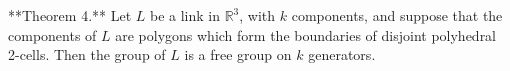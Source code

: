 **Theorem 4.** Let $L$ be a link in $\mathbb{R}^3$, with $k$ components, and suppose that the components of $L$ are polygons which form the boundaries of disjoint polyhedral 2-cells. Then the group of $L$ is a free group on $k$ generators.
